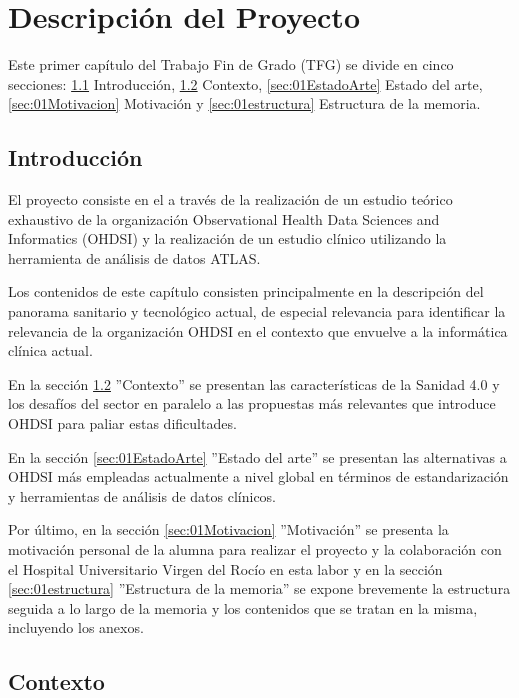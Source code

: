 \chapter{Descripción del Proyecto}\label{cap:01introduccion}

Este primer capítulo del Trabajo Fin de Grado (TFG) se divide en cinco secciones: \ref{sec:01intro} Introducción, \ref{sec:01Contexto} Contexto, \ref{sec:01EstadoArte} Estado del arte, \ref{sec:01Motivacion} Motivación y \ref{sec:01estructura} Estructura de la memoria.

\section{Introducción} \label{sec:01intro}

El proyecto consiste en el \textbf{\textit{\tfgTitle}} a través de la realización de un estudio teórico exhaustivo de la organización Observational Health Data Sciences and Informatics (OHDSI) y la realización de un estudio clínico utilizando la herramienta de análisis de datos ATLAS.

Los contenidos de este capítulo consisten principalmente en la descripción del panorama sanitario y tecnológico actual, de especial relevancia para identificar la relevancia de la organización OHDSI en el contexto que envuelve a la informática clínica actual.

En la sección \ref{sec:01Contexto} ''Contexto'' se presentan las características de la Sanidad 4.0 y los desafíos del sector en paralelo a las propuestas más relevantes que introduce OHDSI para paliar estas dificultades.

En la sección \ref{sec:01EstadoArte} ''Estado del arte'' se presentan las alternativas a OHDSI más empleadas actualmente a nivel global en términos de estandarización y herramientas de análisis de datos clínicos.

Por último, en la sección \ref{sec:01Motivacion} ''Motivación'' se presenta la motivación personal de la alumna para realizar el proyecto y la colaboración con el Hospital Universitario Virgen del Rocío en esta labor y en la sección \ref{sec:01estructura} ''Estructura de la memoria'' se expone brevemente la estructura seguida a lo largo de la memoria y los contenidos que se tratan en la misma, incluyendo los anexos.


\section{Contexto} \label{sec:01Contexto} 

